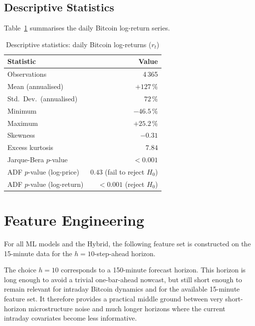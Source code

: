 \documentclass[12pt, a4paper, oneside]{report}
\theoremstyle{plain}
\theoremstyle{definition}
\theoremstyle{remark}
\begin{document}
\subsection{Descriptive Statistics}

Table~\ref{tab:desc_stats} summarises the daily Bitcoin log-return series.

\begin{table}[H]
\begin{singlespace}
\fontsize{10}{11}\selectfont
\caption{Descriptive statistics: daily Bitcoin log-returns ($r_t$)}
\label{tab:desc_stats}
\begin{tabular}{@{}lr@{}}
\toprule
Statistic & Value \\
\midrule
Observations         & 4\,365 \\
Mean (annualised)    & $+127\,\%$ \\
Std.\ Dev.\ (annualised) & $72\,\%$ \\
Minimum              & $-46.5\,\%$ \\
Maximum              & $+25.2\,\%$ \\
Skewness             & $-0.31$ \\
Excess kurtosis      & $7.84$ \\
Jarque-Bera $p$-value & $< 0.001$ \\
ADF $p$-value (log-price)  & $0.43$ (fail to reject $H_0$) \\
ADF $p$-value (log-return) & $< 0.001$ (reject $H_0$) \\
\bottomrule
\end{tabular}
\end{singlespace}
\end{table}

\section{Feature Engineering}

For all ML models and the Hybrid, the following feature set is constructed on
the 15-minute data for the $h = 10$-step-ahead horizon.

The choice $h = 10$ corresponds to a 150-minute forecast horizon.  This horizon
is long enough to avoid a trivial one-bar-ahead nowcast, but still short enough
to remain relevant for intraday Bitcoin dynamics and for the available 15-minute
feature set.  It therefore provides a practical middle ground between very
short-horizon microstructure noise and much longer horizons where the current
intraday covariates become less informative.
\end{document}
